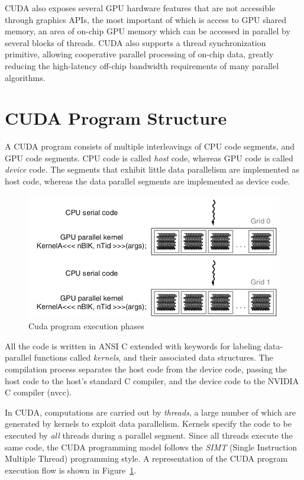 \documentclass[10pt, a4paper]{report}
\begin{document}
CUDA also exposes several GPU hardware features that are not accessible through
graphics APIs, the most important of which is access to GPU shared memory, an
area of on-chip GPU memory which can be accessed in parallel by several blocks
of threads.
CUDA also supports a thread synchronization primitive, allowing cooperative
parallel processing of on-chip data, greatly reducing the high-latency off-chip
bandwidth requirements of many parallel algorithms.

\section{CUDA Program Structure}
A CUDA program consists of multiple interleavings of CPU code segments,
and GPU code segments.
CPU code is called \emph{host} code, whereas GPU code is called \emph{device}
code.
The segments that exhibit little data parallelism are implemented as host code,
whereas the data parallel segments are implemented as device code.

\begin{figure}[h]
\centering
\includegraphics[scale=0.35]{figs/cuda_program_execution_phases}
\caption{Cuda program execution phases}
\label{fig:cuda_program_execution_phases}
\end{figure}

All the code is written in ANSI C extended with keywords for labeling data-
parallel functions called \emph{kernels}, and their associated data structures.
The compilation process separates the host code from the device code, passing
the host code to the host's standard C compiler, and the device code to the
NVIDIA C compiler (nvcc).

In CUDA, computations are carried out by \emph{threads}, a large number of which
are generated by kernels to exploit data parallelism.
Kernels specify the code to be executed by \emph{all} threads during a parallel
segment.
Since all threads execute the same code, the CUDA programming model follows the
\emph{SIMT} (Single Instruction Multiple Thread) programming style.
A representation of the CUDA program execution flow is shown in
Figure~\ref{fig:cuda_program_execution_phases}.
\end{document}
